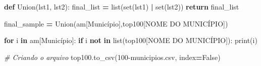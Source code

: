 \documentclass[
  12,
  dvipsnames]{article}
\newenvironment{Shaded}{\begin{snugshade}}{\end{snugshade}}
\newcommand{\BuiltInTok}[1]{#1}
\newcommand{\CommentTok}[1]{\textcolor[rgb]{0.56,0.35,0.01}{\textit{#1}}}
\newcommand{\ControlFlowTok}[1]{\textcolor[rgb]{0.13,0.29,0.53}{\textbf{#1}}}
\newcommand{\KeywordTok}[1]{\textcolor[rgb]{0.13,0.29,0.53}{\textbf{#1}}}
\newcommand{\NormalTok}[1]{#1}
\newcommand{\OperatorTok}[1]{\textcolor[rgb]{0.81,0.36,0.00}{\textbf{#1}}}
\newcommand{\StringTok}[1]{\textcolor[rgb]{0.31,0.60,0.02}{#1}}
\newcommand{\VariableTok}[1]{\textcolor[rgb]{0.00,0.00,0.00}{#1}}
\begin{document}
\begin{Shaded}
\begin{Highlighting}[]
\KeywordTok{def}\NormalTok{ Union(lst1, lst2):}
\NormalTok{    final\_list }\OperatorTok{=} \BuiltInTok{list}\NormalTok{(}\BuiltInTok{set}\NormalTok{(lst1) }\OperatorTok{|} \BuiltInTok{set}\NormalTok{(lst2))}
    \ControlFlowTok{return}\NormalTok{ final\_list}

\NormalTok{final\_sample }\OperatorTok{=}\NormalTok{ Union(am[}\StringTok{\textquotesingle{}Município\textquotesingle{}}\NormalTok{],top100[}\StringTok{\textquotesingle{}NOME DO MUNICÍPIO\textquotesingle{}}\NormalTok{])}

\ControlFlowTok{for}\NormalTok{ i }\KeywordTok{in}\NormalTok{ am[}\StringTok{\textquotesingle{}Município\textquotesingle{}}\NormalTok{]:}
    \ControlFlowTok{if}\NormalTok{ i }\KeywordTok{not} \KeywordTok{in} \BuiltInTok{list}\NormalTok{(top100[}\StringTok{\textquotesingle{}NOME DO MUNICÍPIO\textquotesingle{}}\NormalTok{]):}
        \BuiltInTok{print}\NormalTok{(i)}

\CommentTok{\# Criando o arquivo}
\NormalTok{top100.to\_csv(}\StringTok{\textquotesingle{}100{-}municipios.csv\textquotesingle{}}\NormalTok{, index}\OperatorTok{=}\VariableTok{False}\NormalTok{)}
\end{Highlighting}
\end{Shaded}
\end{document}
